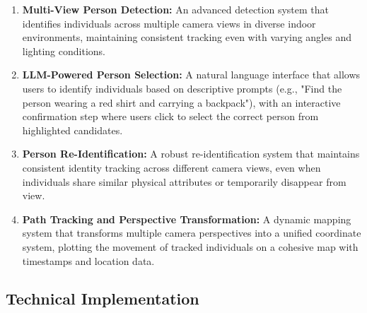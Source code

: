 \begin{enumerate}[leftmargin=80pt]
    \item \textbf{Multi-View Person Detection:} An advanced detection system that identifies individuals across multiple camera views in diverse indoor environments, maintaining consistent tracking even with varying angles and lighting conditions.
    
    \item \textbf{LLM-Powered Person Selection:} A natural language interface that allows users to identify individuals based on descriptive prompts (e.g., "Find the person wearing a red shirt and carrying a backpack"), with an interactive confirmation step where users click to select the correct person from highlighted candidates.
    
    \item \textbf{Person Re-Identification:} A robust re-identification system that maintains consistent identity tracking across different camera views, even when individuals share similar physical attributes or temporarily disappear from view.
    
    \item \textbf{Path Tracking and Perspective Transformation:} A dynamic mapping system that transforms multiple camera perspectives into a unified coordinate system, plotting the movement of tracked individuals on a cohesive map with timestamps and location data.
\end{enumerate}

\subsection{Technical Implementation}
\label{subsection:technical-implementation}

